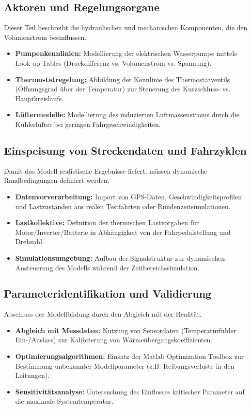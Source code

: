 \subsection{Aktoren und Regelungsorgane}
Dieser Teil beschreibt die hydraulischen und mechanischen Komponenten, die den Volumenstrom beeinflussen.
\begin{itemize}
    \item \textbf{Pumpenkennlinien:} Modellierung der elektrischen Wasserpumpe mittels Look-up-Tables (Druckdifferenz vs. Volumenstrom vs. Spannung).
    \item \textbf{Thermostatregelung:} Abbildung der Kennlinie des Thermostatventils (Öffnungsgrad über der Temperatur) zur Steuerung des Kurzschluss- vs. Hauptkreislaufs.
    \item \textbf{Lüftermodelle:} Modellierung des induzierten Luftmassenstroms durch die Kühlerlüfter bei geringen Fahrgeschwindigkeiten.
\end{itemize}

\subsection{Einspeisung von Streckendaten und Fahrzyklen}
Damit das Modell realistische Ergebnisse liefert, müssen dynamische Randbedingungen definiert werden.
\begin{itemize}
    \item \textbf{Datenvorverarbeitung:} Import von GPS-Daten, Geschwindigkeitsprofilen und Lastzuständen aus realen Testfahrten oder Rundenzeitsimulationen.
    \item \textbf{Lastkollektive:} Definition der thermischen Lastvorgaben für Motor/Inverter/Batterie in Abhängigkeit von der Fahrpedalstellung und Drehzahl.
    \item \textbf{Simulationsumgebung:} Aufbau der Signalstruktur zur dynamischen Ansteuerung des Modells während der Zeitbereichssimulation.
\end{itemize}

\subsection{Parameteridentifikation und Validierung}
Abschluss der Modellbildung durch den Abgleich mit der Realität.
\begin{itemize}
    \item \textbf{Abgleich mit Messdaten:} Nutzung von Sensordaten (Temperaturfühler Ein-/Auslass) zur Kalibrierung von Wärmeübergangskoeffizienten.
    \item \textbf{Optimierungsalgorithmen:} Einsatz der Matlab Optimization Toolbox zur Bestimmung unbekannter Modellparameter (z.B. Reibungsverluste in den Leitungen).
    \item \textbf{Sensitivitätsanalyse:} Untersuchung des Einflusses kritischer Parameter auf die maximale Systemtemperatur.
\end{itemize}


